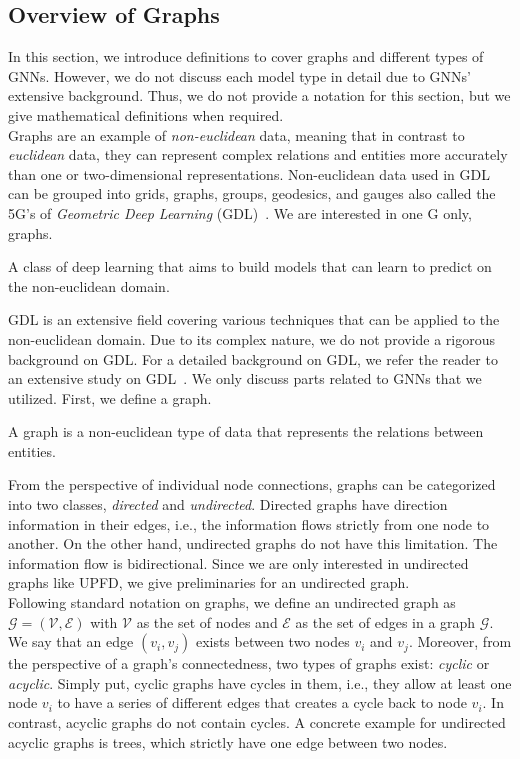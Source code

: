 \subsection{Overview of Graphs}
\label{subsec:mixedApproaches_OverviewOfGraphs}
In this section, we introduce definitions to cover graphs and different types of GNNs. However, we do not discuss each model type in detail due to GNNs' extensive background. Thus, we do not provide a notation for this section, but we give mathematical definitions when required.\\
Graphs are an example of \emph{non-euclidean} data, meaning that in contrast to \emph{euclidean} data, they can represent complex relations and entities more accurately than one or two-dimensional representations. Non-euclidean data used in GDL can be grouped into grids, graphs, groups, geodesics, and gauges also called the 5G's of \emph{Geometric Deep Learning} (GDL)~\parencite{GeometricDeepLearning_Bronstein}. We are interested in one G only, graphs.
\begin{definition}
    A class of deep learning that aims to build models that can learn to predict on the non-euclidean domain.
\end{definition}
GDL is an extensive field covering various techniques that can be applied to the non-euclidean domain. Due to its complex nature, we do not provide a rigorous background on GDL. For a detailed background on GDL, we refer the reader to an extensive study on GDL~\parencite{GeometricDeepLearning_Bronstein}. We only discuss parts related to GNNs that we utilized. First, we define a graph.
\begin{definition}
    A graph is a non-euclidean type of data that represents the relations between entities.
\end{definition}
From the perspective of individual node connections, graphs can be categorized into two classes, \emph{directed} and \emph{undirected}. Directed graphs have direction information in their edges, i.e., the information flows strictly from one node to another. On the other hand, undirected graphs do not have this limitation. The information flow is bidirectional. Since we are only interested in undirected graphs like UPFD, we give preliminaries for an undirected graph.\\
Following standard notation on graphs, we define an undirected graph as $\mathcal{G} = (\mathcal{V}, \mathcal{E})$ with $\mathcal{V}$ as the set of nodes and $\mathcal{E}$ as the set of edges in a graph $\mathcal{G}$. We say that an edge $(v_i, v_j)$ exists between two nodes $v_i$ and $v_j$. Moreover, from the perspective of a graph's connectedness, two types of graphs exist: \emph{cyclic} or \emph{acyclic}. Simply put, cyclic graphs have cycles in them, i.e., they allow at least one node $v_i$ to have a series of different edges that creates a cycle back to node $v_i$. In contrast, acyclic graphs do not contain cycles. A concrete example for undirected acyclic graphs is trees, which strictly have one edge between two nodes.\\
